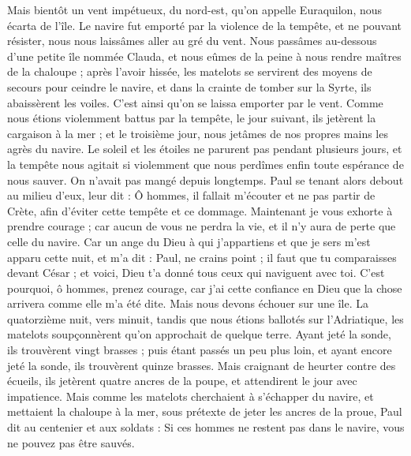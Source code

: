 \begin{multicols}{2}
Mais bientôt un vent impétueux, du nord-est, qu'on appelle Euraquilon, nous écarta de l'île.
Le navire fut emporté par la violence de la tempête, et ne pouvant résister, nous nous laissâmes aller au gré du vent.
Nous passâmes au-dessous d’une petite île nommée Clauda, et nous eûmes de la peine à nous rendre maîtres de la chaloupe ;
après l’avoir hissée, les matelots se servirent des moyens de secours pour ceindre le navire, et dans la crainte de tomber sur la Syrte, ils abaissèrent les voiles. C’est ainsi qu’on se laissa emporter par le vent.
Comme nous étions violemment battus par la tempête, le jour suivant, ils jetèrent la cargaison à la mer ;
et le troisième jour, nous jetâmes de nos propres mains les agrès du navire.
Le soleil et les étoiles ne parurent pas pendant plusieurs jours, et la tempête nous agitait si violemment que nous perdîmes enfin toute espérance de nous sauver.
On n’avait pas mangé depuis longtemps. Paul se tenant alors debout au milieu d'eux, leur dit : Ô hommes, il fallait m’écouter et ne pas partir de Crète, afin d’éviter cette tempête et ce dommage.
Maintenant je vous exhorte à prendre courage ; car aucun de vous ne perdra la vie, et il n’y aura de perte que celle du navire.
Car un ange du Dieu à qui j’appartiens et que je sers m’est apparu cette nuit,
et m’a dit : Paul, ne crains point ; il faut que tu comparaisses devant César ; et voici, Dieu t'a donné tous ceux qui naviguent avec toi.
C'est pourquoi, ô hommes, prenez courage, car j'ai cette confiance en Dieu que la chose arrivera comme elle m'a été dite.
Mais nous devons échouer sur une île.
La quatorzième nuit, vers minuit, tandis que nous étions ballotés sur l’Adriatique, les matelots soupçonnèrent qu’on approchait de quelque terre.
Ayant jeté la sonde, ils trouvèrent vingt brasses ; puis étant passés un peu plus loin, et ayant encore jeté la sonde, ils trouvèrent quinze brasses.
Mais craignant de heurter contre des écueils, ils jetèrent quatre ancres de la poupe, et attendirent le jour avec impatience.
Mais comme les matelots cherchaient à s’échapper du navire, et mettaient la chaloupe à la mer, sous prétexte de jeter les ancres de la proue,
Paul dit au centenier et aux soldats : Si ces hommes ne restent pas dans le navire, vous ne pouvez pas être sauvés.

\end{multicols}
